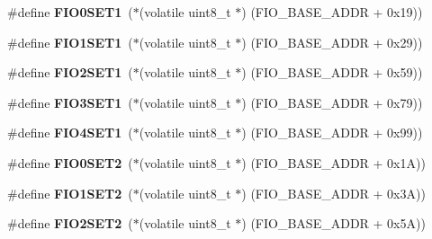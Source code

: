 \begin{DoxyCompactItemize}
\item 
\mbox{\label{group__lpc24xx__regs_ga18db7dcbbab1a6844772427d400c2b51}} 
\#define {\bfseries F\+I\+O0\+S\+E\+T1}~($\ast$(volatile uint8\+\_\+t $\ast$) (F\+I\+O\+\_\+\+B\+A\+S\+E\+\_\+\+A\+D\+DR + 0x19))
\item 
\mbox{\label{group__lpc24xx__regs_ga456179014bc2a33838948af72631e49d}} 
\#define {\bfseries F\+I\+O1\+S\+E\+T1}~($\ast$(volatile uint8\+\_\+t $\ast$) (F\+I\+O\+\_\+\+B\+A\+S\+E\+\_\+\+A\+D\+DR + 0x29))
\item 
\mbox{\label{group__lpc24xx__regs_ga10067222b27fd3a51cc2a25ec26766ef}} 
\#define {\bfseries F\+I\+O2\+S\+E\+T1}~($\ast$(volatile uint8\+\_\+t $\ast$) (F\+I\+O\+\_\+\+B\+A\+S\+E\+\_\+\+A\+D\+DR + 0x59))
\item 
\mbox{\label{group__lpc24xx__regs_gaf3de86493c7ff6d89f773b9f2ab212cb}} 
\#define {\bfseries F\+I\+O3\+S\+E\+T1}~($\ast$(volatile uint8\+\_\+t $\ast$) (F\+I\+O\+\_\+\+B\+A\+S\+E\+\_\+\+A\+D\+DR + 0x79))
\item 
\mbox{\label{group__lpc24xx__regs_gad2972c8bcbd8365c08bd608622486003}} 
\#define {\bfseries F\+I\+O4\+S\+E\+T1}~($\ast$(volatile uint8\+\_\+t $\ast$) (F\+I\+O\+\_\+\+B\+A\+S\+E\+\_\+\+A\+D\+DR + 0x99))
\item 
\mbox{\label{group__lpc24xx__regs_gad55cb0e8ba1c48ebd940bc881439ac0d}} 
\#define {\bfseries F\+I\+O0\+S\+E\+T2}~($\ast$(volatile uint8\+\_\+t $\ast$) (F\+I\+O\+\_\+\+B\+A\+S\+E\+\_\+\+A\+D\+DR + 0x1\+A))
\item 
\mbox{\label{group__lpc24xx__regs_ga36c1507b935d9d1f3bbd9eb467d41a5a}} 
\#define {\bfseries F\+I\+O1\+S\+E\+T2}~($\ast$(volatile uint8\+\_\+t $\ast$) (F\+I\+O\+\_\+\+B\+A\+S\+E\+\_\+\+A\+D\+DR + 0x3\+A))
\item 
\mbox{\label{group__lpc24xx__regs_ga87a87b4e77d7624c626f601ff0089df6}} 
\#define {\bfseries F\+I\+O2\+S\+E\+T2}~($\ast$(volatile uint8\+\_\+t $\ast$) (F\+I\+O\+\_\+\+B\+A\+S\+E\+\_\+\+A\+D\+DR + 0x5\+A))
\item 
\mbox{\label{group__lpc24xx__regs_ga10cb1e7dd2d40d8a6befeaf26e611abe}} 

\end{DoxyCompactItemize}

